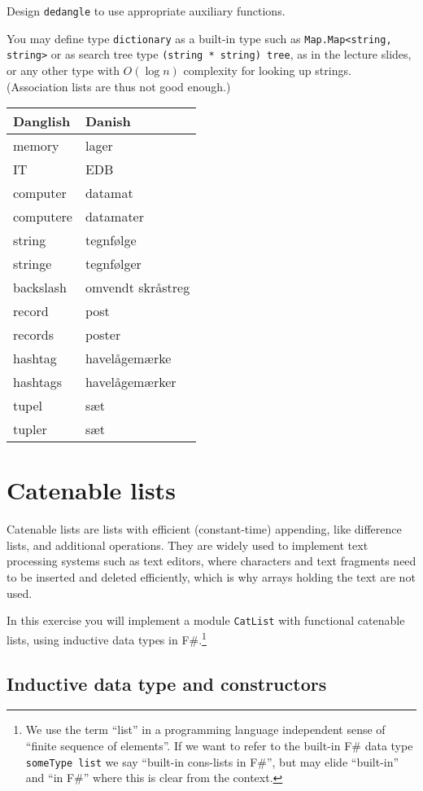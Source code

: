 \documentclass[a4paper,11pt]{article}
\begin{document}
Design \verb|dedangle| to use appropriate auxiliary functions. 

You may define type \verb|dictionary| as a built-in type such as \verb|Map.Map<string, string>| or as search tree type \verb|(string * string) tree|, as in the lecture slides, or any other type with $O(\log n)$ complexity for looking up strings.  (Association lists are thus not good enough.)

\begin{tabular}{|l|l|} \hline
Danglish & Danish \\ \hline
memory & lager \\
IT & EDB \\
computer & datamat \\
computere & datamater \\
string & tegnf\o lge \\
stringe & tegnf\o lger \\
backslash & omvendt skr\aa streg \\
record & post \\
records & poster \\
hashtag & havel\aa gem\ae rke \\
hashtags & havel\aa gem\ae rker \\
tupel & s\ae t \\ 
tupler & s\ae t \\ \hline
\end{tabular}

\section{Catenable lists}

Catenable lists are lists with efficient (constant-time) appending, like difference lists, and additional operations.  They are widely used to implement text processing systems such as text editors, where characters and text fragments need to be inserted and deleted efficiently, which is why arrays holding the text are not used.

In this exercise you will implement a module \texttt{CatList} with functional catenable lists, using inductive data types in F\#.\footnote{We use the term ``list'' in a programming language independent sense of ``finite sequence of elements''.  If we want to refer to the built-in F\# data type \texttt{someType list} we say ``built-in cons-lists in F\#'', but may elide ``built-in'' and ``in F\#'' where this is clear from the context.}

\subsection{Inductive data type and constructors}
\end{document}
